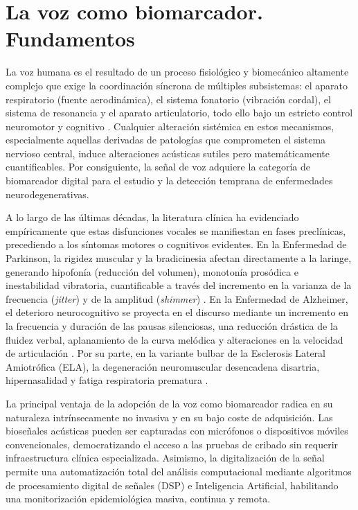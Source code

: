 \section{La voz como biomarcador. Fundamentos}\label{sec:voz_biomarcador}

La voz humana es el resultado de un proceso fisiológico y biomecánico altamente complejo que exige la coordinación síncrona de múltiples subsistemas: el aparato respiratorio (fuente aerodinámica), el sistema fonatorio (vibración cordal), el sistema de resonancia y el aparato articulatorio, todo ello bajo un estricto control neuromotor y cognitivo \cite{romero2018}. Cualquier alteración sistémica en estos mecanismos, especialmente aquellas derivadas de patologías que comprometen el sistema nervioso central, induce alteraciones acústicas sutiles pero matemáticamente cuantificables. Por consiguiente, la señal de voz adquiere la categoría de biomarcador digital para el estudio y la detección temprana de enfermedades neurodegenerativas.

A lo largo de las últimas décadas, la literatura clínica ha evidenciado empíricamente que estas disfunciones vocales se manifiestan en fases preclínicas, precediendo a los síntomas motores o cognitivos evidentes. En la Enfermedad de Parkinson, la rigidez muscular y la bradicinesia afectan directamente a la laringe, generando hipofonía (reducción del volumen), monotonía prosódica e inestabilidad vibratoria, cuantificable a través del incremento en la varianza de la frecuencia (\textit{jitter}) y de la amplitud (\textit{shimmer}) \cite{moro-velazquezNewToolsDifferential2021}. En la Enfermedad de Alzheimer, el deterioro neurocognitivo se proyecta en el discurso mediante un incremento en la frecuencia y duración de las pausas silenciosas, una reducción drástica de la fluidez verbal, aplanamiento de la curva melódica y alteraciones en la velocidad de articulación \cite{garcia-gutierrezUnveilingSoundCognitive2024}. Por su parte, en la variante bulbar de la Esclerosis Lateral Amiotrófica (ELA), la degeneración neuromuscular desencadena disartria, hipernasalidad y fatiga respiratoria prematura \cite{gutz2019}.

La principal ventaja de la adopción de la voz como biomarcador radica en su naturaleza intrínsecamente no invasiva y en su bajo coste de adquisición. Las bioseñales acústicas pueden ser capturadas con micrófonos o dispositivos móviles convencionales, democratizando el acceso a las pruebas de cribado sin requerir infraestructura clínica especializada. Asimismo, la digitalización de la señal permite una automatización total del análisis computacional mediante algoritmos de procesamiento digital de señales (DSP) e Inteligencia Artificial, habilitando una monitorización epidemiológica masiva, continua y remota.

